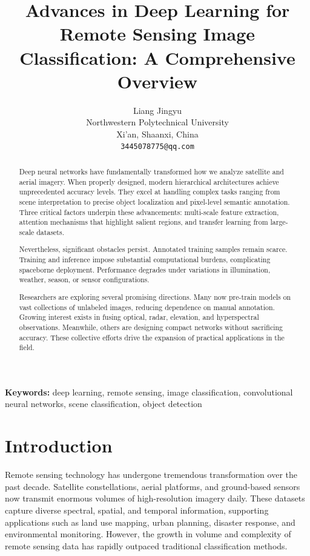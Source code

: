 \documentclass[12pt,a4paper]{article}
\title{\fontsize{14}{17}\selectfont\textbf{Advances in Deep Learning for Remote Sensing Image Classification: A Comprehensive Overview}}
\author{Liang Jingyu\\
        Northwestern Polytechnical University\\
        Xi'an, Shaanxi, China\\
        \texttt{3445078775@qq.com}}
\date{}
\begin{document}
\maketitle

\begin{abstract}
Deep neural networks have fundamentally transformed how we analyze satellite and aerial imagery. When properly designed, modern hierarchical architectures achieve unprecedented accuracy levels. They excel at handling complex tasks ranging from scene interpretation to precise object localization and pixel-level semantic annotation. Three critical factors underpin these advancements: multi-scale feature extraction, attention mechanisms that highlight salient regions, and transfer learning from large-scale datasets.

Nevertheless, significant obstacles persist. Annotated training samples remain scarce. Training and inference impose substantial computational burdens, complicating spaceborne deployment. Performance degrades under variations in illumination, weather, season, or sensor configurations.

Researchers are exploring several promising directions. Many now pre-train models on vast collections of unlabeled images, reducing dependence on manual annotation. Growing interest exists in fusing optical, radar, elevation, and hyperspectral observations. Meanwhile, others are designing compact networks without sacrificing accuracy. These collective efforts drive the expansion of practical applications in the field.
\end{abstract}

\textbf{Keywords:} deep learning, remote sensing, image classification, convolutional neural networks, scene classification, object detection

\section{Introduction}
\label{sec:introduction}
Remote sensing technology has undergone tremendous transformation over the past decade. Satellite constellations, aerial platforms, and ground-based sensors now transmit enormous volumes of high-resolution imagery daily. These datasets capture diverse spectral, spatial, and temporal information, supporting applications such as land use mapping, urban planning, disaster response, and environmental monitoring. However, the growth in volume and complexity of remote sensing data has rapidly outpaced traditional classification methods.
\end{document}
